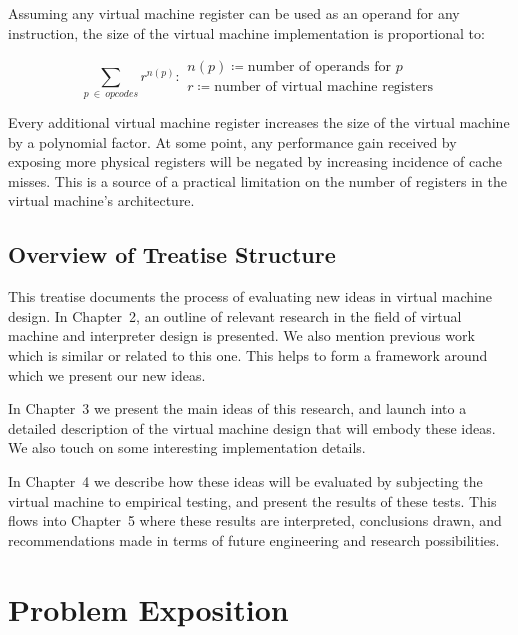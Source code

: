 			Assuming any virtual machine register can be used as an operand for any instruction, the size of the virtual machine implementation is proportional to:
			
			\[
				\sum_{p~\in~opcodes} r^{n(p)} : 
					\begin{array}{l}
						n(p) \coloneqq \text{number of operands for $p$} \\
						r \coloneqq \text{number of virtual machine registers}
					\end{array}
			\] 
			
			Every additional virtual machine register increases the size of the virtual machine by a polynomial factor. At some point, any performance gain received by exposing more physical registers will be negated by increasing incidence of cache misses. This is a source of a practical limitation on the number of registers in the virtual machine's architecture.
				
	\section{Overview of Treatise Structure}
		This treatise documents the process of evaluating new ideas in virtual machine design. In Chapter~2, an outline of relevant research in the field of virtual machine and interpreter design is presented. We also mention previous work which is similar or related to this one. This helps to form a framework around which we present our new ideas.
		
		In Chapter~3 we present the main ideas of this research, and launch into a detailed description of the virtual machine design that will embody these ideas. We also touch on some interesting implementation details.
		
		In Chapter~4 we describe how these ideas will be evaluated by subjecting the virtual machine to empirical testing, and present the results of these tests. This flows into Chapter~5 where these results are interpreted, conclusions drawn, and recommendations made in terms of future engineering and research possibilities.

\chapter{Problem Exposition}
